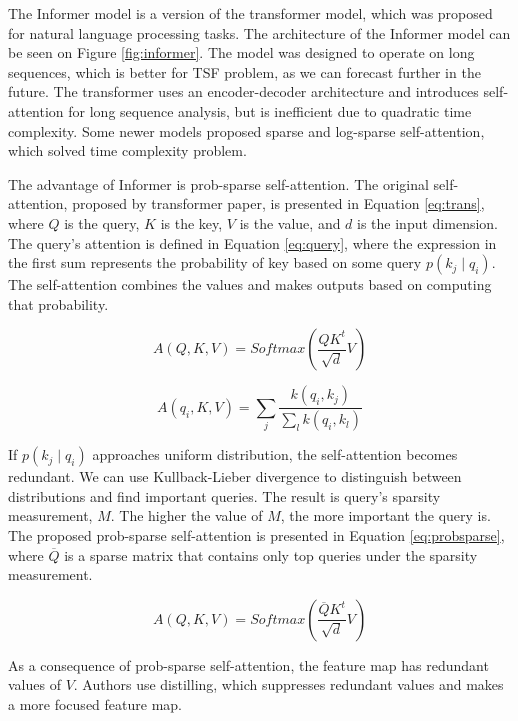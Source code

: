 \documentclass[conference]{IEEEtran}
\begin{document}
The Informer model is a version of the transformer model, which was proposed for natural language processing tasks.
The architecture of the Informer model can be seen on Figure \ref{fig:informer}.
The model was designed to operate on long sequences, which is better for TSF problem, as we can forecast further in the future.
The transformer uses an encoder-decoder architecture and introduces self-attention for long sequence analysis, but is inefficient due to quadratic time complexity.
Some newer models proposed sparse and log-sparse self-attention, which solved time complexity problem.

The advantage of Informer is prob-sparse self-attention.
The original self-attention, proposed by transformer paper, is presented in Equation \ref{eq:trans}, where $Q$ is the query, $K$ is the key, $V$ is the value, and $d$ is the input dimension.
The query's attention is defined in Equation \ref{eq:query}, where the expression in the first sum represents the probability of key based on some query $p(k_{j}\mid q_{i})$.
The self-attention combines the values and makes outputs based on computing that probability.

\begin{equation}
\label{eq:trans}
    A(Q, K, V) = Softmax\left(\frac{QK^{t}}{\sqrt{d}}V\right)
\end{equation}

\begin{equation}
\label{eq:query}
    A(q_{i}, K, V) = \sum_{j}\frac{k(q_{i}, k_{j})}{\sum_{l}k(q_{i}, k_{l})}
\end{equation}

If $p(k_{j}\mid q_{i})$ approaches uniform distribution, the self-attention becomes redundant.
We can use Kullback-Lieber divergence to distinguish between distributions and find important queries.
The result is query's sparsity measurement, $M$.
The higher the value of $M$, the more important the query is.
The proposed prob-sparse self-attention is presented in Equation \ref{eq:probsparse}, where $\overline{Q}$ is a sparse matrix that contains only top queries under the sparsity measurement. 

\begin{equation}
\label{eq:probsparse}
    A(Q, K, V) = Softmax\left(\frac{\overline{Q}K^{t}}{\sqrt{d}}V\right)
\end{equation}

As a consequence of prob-sparse self-attention, the feature map has redundant values of $V$.
Authors use distilling, which suppresses redundant values and makes a more focused feature map.
\end{document}
